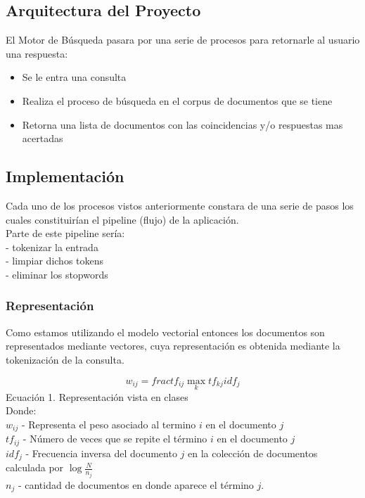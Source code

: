 \documentclass[runningheads]{llncs}
\begin{document}
\subsection*{Arquitectura del Proyecto}
El Motor de Búsqueda pasara por una serie de procesos para retornarle al usuario una respuesta:
\begin{itemize}
	\item Se le entra una consulta
	\item Realiza el proceso de búsqueda en el corpus de documentos que se tiene
	\item Retorna una lista de documentos con las coincidencias y/o respuestas mas acertadas 
\end{itemize}

\subsection*{Implementación}
Cada uno de los procesos vistos anteriormente constara de una serie de pasos los cuales constituirían el pipeline (flujo) de la aplicación.\\

Parte de este pipeline sería: \\
- tokenizar la entrada \\
- limpiar dichos tokens \\
- eliminar los stopwords

\subsubsection*{Representación}
Como estamos utilizando el modelo vectorial entonces los documentos son representados mediante vectores, cuya representación es obtenida mediante la tokenización de la consulta.

\begin{equation}
	w_{ij} = frac{tf_{ij}}{\max_{k} tf_{kj}}idf_{j}
\end{equation}
Ecuación 1. Representación vista en clases\\

Donde:\\
$ w_{ij} $ - Representa el peso asociado al termino $ i $ en el documento $ j $\\
$tf_{ij}$ - Número de veces que se repite el término $i$ en el documento $j$\\
$idf_{j}$ - Frecuencia inversa del documento $j$ en la colección de documentos calculada por $\log{\frac{N}{n_j}}$\\
$n_j$ - cantidad de documentos en donde aparece el término $j$.
\end{document}

